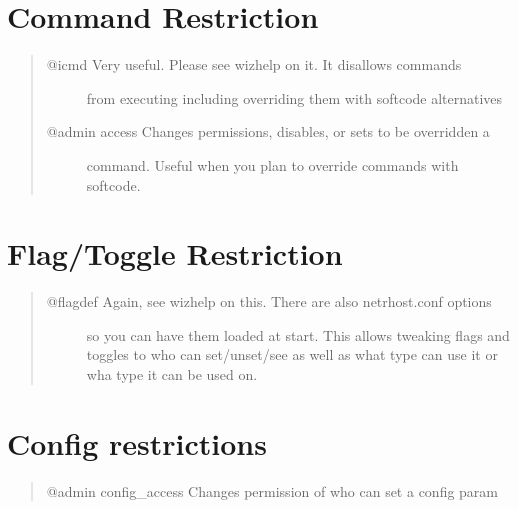 \documentclass[letterpaper,10pt,english]{sphinxmanual}
\begin{document}
\section{Command Restriction}
\label{\detokenize{08-lockdown:command-restriction}}\begin{quote}
\begin{description}
\item[{@icmd    \sphinxhyphen{} Very useful.   Please see wizhelp on it.  It disallows commands}] \leavevmode
\sphinxAtStartPar
from executing including overriding them with softcode alternatives

\item[{@admin access \sphinxhyphen{} Changes permissions, disables, or sets to be overridden a}] \leavevmode
\sphinxAtStartPar
command.  Useful when you plan to override commands with softcode.

\end{description}
\end{quote}


\section{Flag/Toggle Restriction}
\label{\detokenize{08-lockdown:flag-toggle-restriction}}\begin{quote}
\begin{description}
\item[{@flagdef \sphinxhyphen{} Again, see wizhelp on this.  There are also netrhost.conf options}] \leavevmode
\sphinxAtStartPar
so you can have them loaded at start.  This allows tweaking flags
and toggles to who can set/unset/see as well as what type can
use it or wha type it can be used on.

\end{description}
\end{quote}


\section{Config restrictions}
\label{\detokenize{08-lockdown:config-restrictions}}\begin{quote}

\sphinxAtStartPar
@admin config\_access \sphinxhyphen{} Changes permission of who can set a config param
\end{quote}
\end{document}
